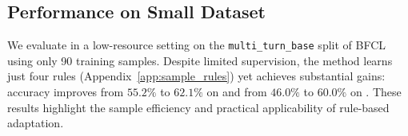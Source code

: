\subsection{Performance on Small Dataset}

We evaluate \shortname in a low-resource setting on the \texttt{multi\_turn\_base} split of
BFCL using only 90 training samples. Despite limited supervision, the method learns just
four rules (Appendix~\ref{app:sample_rules}) yet achieves substantial gains: accuracy
improves from $55.2\%$ to $62.1\%$ on \rand and from $46.0\%$ to $60.0\%$ on \unseen. These
results highlight the sample efficiency and practical applicability of rule-based
adaptation.
